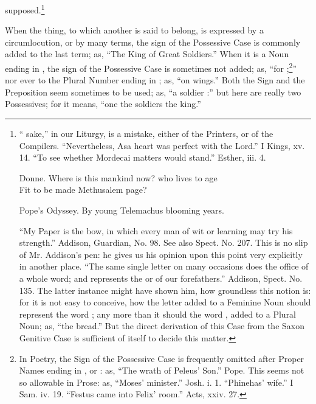 supposed.\footnote{`` sake,'' in our Liturgy, is a
  mistake, either of the Printers, or of the Compilers. ``Nevertheless,
  Asa  heart was perfect with the Lord.'' I Kings, xv. 14. ``To
  see whether Mordecai  matters would stand.'' Esther, iii. 4.

  \begin{aquote}{Donne.}
    Where is this mankind now? who lives to age\\
    Fit to be made Methusalem  page?
  \end{aquote}

  \begin{aquote}{Pope's Odyssey.}
    By young Telemachus  blooming years.
  \end{aquote}

  ``My Paper is the  bow, in which every man of wit or
  learning may try his strength.'' Addison, Guardian, No. 98. See also
  Spect. No. 207. This is no slip of Mr. Addison's pen: he gives us his
  opinion upon this point very explicitly in another place. ``The same
  single letter  on many occasions does the office of a whole
  word; and represents the  or  of our forefathers.''
  Addison, Spect. No. 135. The latter instance might have shown him, how
  groundless this notion is: for it is not easy to conceive, how the
  letter  added to a Feminine Noun should represent the word
  ; any more than it should the word , added to a
  Plural Noun; as, ``the  bread.'' But the direct
  derivation of this Case from the Saxon Genitive Case is sufficient of
  itself to decide this matter.}

When the thing, to which another is said to belong, is expressed by a
circumlocution, or by many terms, the sign of the Possessive Case is
commonly added to the last term; as, ``The King of Great 
Soldiers.'' When it is a Noun ending in , the sign of the
Possessive Case is sometimes not added; as, ``for ;\footnote{In Poetry, the Sign of the Possessive Case is
  frequently omitted after Proper Names ending in , or : as,
``The wrath of Peleus' Son.'' Pope. This seems not so allowable in
Prose: as, ``Moses' minister.'' Josh. i. 1. ``Phinehas' wife.'' I Sam.
iv. 19. ``Festus came into Felix' room.'' Acts, xxiv. 27.}'' nor ever to
the Plural Number ending in ; as, ``on 
wings.\footnotemark'' Both the Sign and the Preposition seem sometimes
to be used; as, ``a soldier :'' but here are really
two Possessives; for it means, ``one  the soldiers  the
king.''

